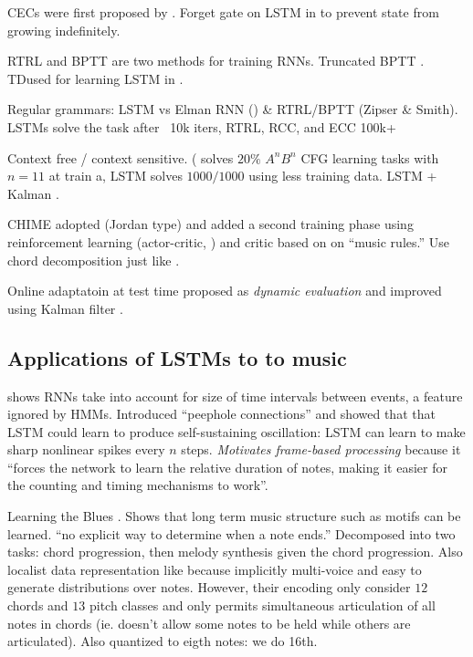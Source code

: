 \documentclass[dissertation.tex]{subfiles}
\begin{document}
CECs were first proposed by \cite{hochreiter1997long}. Forget gate on LSTM
in \cite{gers2000learning} to prevent state from growing indefinitely.

RTRL \cite{robinson1987utility} and BPTT \cite{williams1995gradient} are two
methods for training RNNs. Truncated BPTT \cite{williams1990efficient}.
TD\cite{sutton1998reinforcement}used for learning LSTM in
\cite{franklin2004predicting}.

Regular grammars: LSTM vs Elman RNN (\cite{elman1990finding}) \& RTRL/BPTT (Zipser \& Smith).
LSTMs solve the task after ~10k iters, RTRL, RCC, and ECC 100k+

Context free / context sensitive. (\cite{wiles1995learning} solves $20\%$ $A^n
B^n$ CFG learning tasks with $n = 11$ at train a, LSTM\cite{gers2001lstm}
solves $1000/1000$ using less training data. LSTM + Kalman \cite{gers2002dekf}.

CHIME \cite{franklin2001learning} adopted \cite{todd1989connectionist} (Jordan type) and
added a second training phase using reinforcement learning (actor-critic, \cite{sutton1998reinforcement})
and critic based on on ``music rules.'' Use chord decomposition just
like \cite{Eck2002}.

Online adaptatoin at test time proposed as \emph{dynamic evaluation}
\cite{Mikolov2010} \cite{Mikolov2012} and improved using Kalman filter
\cite{gers2002dekf}.

\subsection{Applications of LSTMs to to music}

\cite{gers2000recurrent}\cite{gers2002learning} shows RNNs take into account
for size of time intervals between events, a feature ignored by HMMs.
Introduced ``peephole connections'' and showed that that LSTM could learn to
produce self-sustaining oscillation: LSTM can learn to make sharp nonlinear
spikes every $n$ steps. \emph{Motivates frame-based processing} because it ``forces
the network to learn the relative duration of notes, making it easier for the
counting and timing mechanisms to work''\cite{Eck2002}.

Learning the Blues \cite{Eck2002} \cite{Eck2002-blues}. Shows that long term
music structure such as motifs can be learned. ``no explicit way to determine
when a note ends.'' Decomposed into two tasks: chord progression, then melody synthesis
given the chord progression. Also localist data representation like
\cite{todd1989connectionist} because implicitly multi-voice and easy to
generate distributions over notes. However, their encoding only consider $12$
chords and $13$ pitch classes and only permits simultaneous articulation of all
notes in chords (ie. doesn't allow some notes to be held while others are
articulated). Also quantized to eigth notes: we do 16th.
\end{document}
